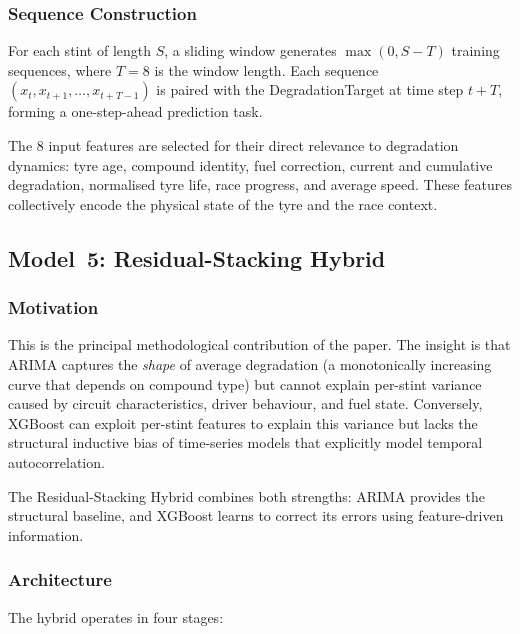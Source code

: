 \documentclass[journal,twoside]{IEEEtran}
\begin{document}
\subsubsection{Sequence Construction}

For each stint of length $S$, a sliding window generates $\max(0,
S - T)$ training sequences, where $T=8$ is the window length.  Each
sequence $(x_{t}, x_{t+1}, \ldots, x_{t+T-1})$ is paired with the
DegradationTarget at time step $t + T$, forming a one-step-ahead
prediction task.

The 8 input features are selected for their direct relevance to
degradation dynamics: tyre age, compound identity, fuel correction,
current and cumulative degradation, normalised tyre life, race
progress, and average speed.  These features collectively encode the
physical state of the tyre and the race context.

\subsection{Model~5: Residual-Stacking Hybrid}\label{sec:hybrid}

\subsubsection{Motivation}

This is the principal methodological contribution of the paper.  The
insight is that ARIMA captures the \emph{shape} of average degradation
(a monotonically increasing curve that depends on compound type) but
cannot explain per-stint variance caused by circuit characteristics,
driver behaviour, and fuel state.  Conversely, XGBoost can exploit
per-stint features to explain this variance but lacks the structural
inductive bias of time-series models that explicitly model temporal
autocorrelation.

The Residual-Stacking Hybrid combines both strengths: ARIMA provides
the structural baseline, and XGBoost learns to correct its errors
using feature-driven information.

\subsubsection{Architecture}

The hybrid operates in four stages:
\end{document}
